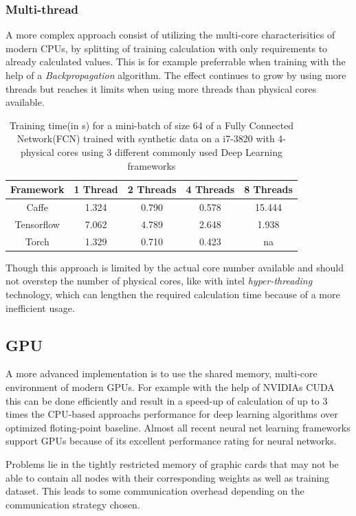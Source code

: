 \documentclass[conference]{IEEEtran}
\begin{document}
\subsubsection{Multi-thread}
A more complex approach consist of utilizing the multi-core characterisitics of modern CPUs, by splitting of training calculation with only requirements to already calculated values. This is for example preferrable when training with the help of a \emph{Backpropagation} algorithm. The effect  continues to grow by using more threads but reaches it limits when using more threads than physical cores available.
\begin{table} 
\centering
\begin{tabular}{c c c c c}
\hline
Framework & 1 Thread & 2 Threads &4 Threads & 8 Threads\\\hline
Caffe & 1.324 & 0.790 & 0.578 & 15.444 \\
Tensorflow & 7.062 & 4.789 & 2.648 & 1.938 \\
Torch & 1.329 & 0.710 & 0.423 & na \\\hline
\end{tabular}
\caption{Training time(in s) for a mini-batch of size 64 of a Fully Connected Network(FCN) trained with synthetic data on a i7-3820 with 4-physical cores using 3 different commonly used Deep Learning frameworks\cite{shi2016benchmarking}}
\label{fig_ttfcn}
\end{table}
Though this approach is limited by the actual core number available and should not overstep the number of physical cores, like with intel \emph{hyper-threading} technology, which can lengthen the required calculation time because of a more inefficient usage\cite{shi2016benchmarking}.
\subsection{GPU}
A more advanced implementation is to use the shared memory, multi-core environment of modern GPUs. For example with the help of  NVIDIAs CUDA this can be done efficiently and result in a speed-up of calculation of up to 3 times the CPU-based approachs performance for deep learning algorithms over optimized floting-point baseline\cite{shi2016benchmarking}. Almost all recent neural net learning frameworks support GPUs because of its excellent performance rating for neural networks.

Problems lie in the tightly restricted memory of graphic cards that may not be able to contain all nodes with their corresponding weights as well as training dataset. This leads to some communication overhead depending on the communication strategy chosen.
\end{document}
